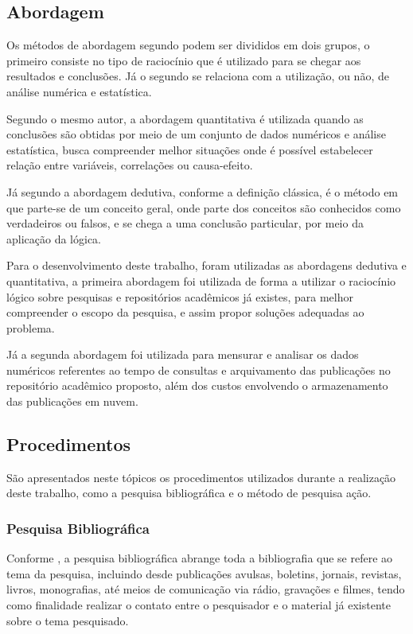 \subsection{Abordagem}

Os métodos de abordagem segundo \citep[p. 29]{LOVATO:metodologia} podem ser
divididos em dois grupos, o primeiro consiste no tipo de raciocínio que
é utilizado para se chegar aos resultados e conclusões. Já o segundo
se relaciona com a utilização, ou não, de análise numérica e estatística.

Segundo o mesmo autor, a abordagem quantitativa é utilizada quando
as conclusões são obtidas por meio de um conjunto de dados numéricos
e análise estatística, busca compreender melhor situações onde é possível
estabelecer relação entre variáveis, correlações ou causa-efeito.

Já segundo \cite{GIL:metodologia} a abordagem dedutiva, conforme a definição clássica,
é o método em que parte-se de um conceito geral, onde parte dos
conceitos são conhecidos como verdadeiros ou falsos, e se chega
a uma conclusão particular, por meio da aplicação da lógica.

Para o desenvolvimento deste trabalho, foram utilizadas as abordagens
dedutiva e quantitativa, a primeira abordagem foi utilizada
de forma a utilizar o raciocínio lógico sobre pesquisas e repositórios
acadêmicos já existes, para melhor compreender o escopo da pesquisa,
e assim propor soluções adequadas ao problema.

Já a segunda abordagem foi utilizada para mensurar e analisar
os dados numéricos referentes ao tempo de consultas e arquivamento
das publicações no repositório acadêmico proposto, além dos
custos envolvendo o armazenamento das publicações em nuvem.

\subsection{Procedimentos}

São apresentados neste tópicos os procedimentos utilizados
durante a realização deste trabalho, como a pesquisa bibliográfica e
o método de pesquisa ação.

\subsubsection{Pesquisa Bibliográfica}

Conforme \citep[p. 183]{LAKATOS2003:metodologia}, a pesquisa bibliográfica
abrange toda a bibliografia que se refere ao tema da pesquisa,
incluindo desde publicações avulsas, boletins, jornais, revistas,
livros, monografias, até meios de comunicação via rádio,
gravações e filmes, tendo como finalidade realizar o contato
entre o pesquisador e o material já existente sobre o tema pesquisado.

